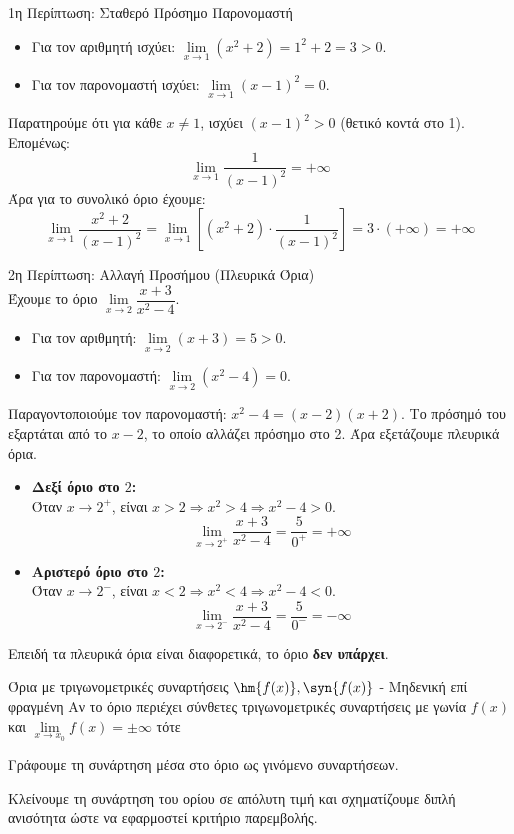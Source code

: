\begin{alist}
\item  1η Περίπτωση: Σταθερό Πρόσημο Παρονομαστή
\begin{itemize}
    \item Για τον αριθμητή ισχύει: $\lim\limits_{x\to 1} (x^2+2) = 1^2 + 2 = 3 > 0$.
    \item Για τον παρονομαστή ισχύει: $\lim\limits_{x\to 1} (x-1)^2 = 0$.
\end{itemize}
Παρατηρούμε ότι για κάθε $x \neq 1$, ισχύει $(x-1)^2 > 0$ (θετικό κοντά στο 1).
\\
Επομένως:
\[ \lim\limits_{x\to 1} \dfrac{1}{(x-1)^2} = +\infty \]
Άρα για το συνολικό όριο έχουμε:
\[ \lim\limits_{x\to 1} \dfrac{x^2+2}{(x-1)^2} = \lim\limits_{x\to 1} \left[ (x^2+2) \cdot \dfrac{1}{(x-1)^2} \right] = 3 \cdot (+\infty) = +\infty \]

\vspace{0.5cm}
\item  2η Περίπτωση: Αλλαγή Προσήμου (Πλευρικά Όρια)
\\
Έχουμε το όριο $\displaystyle \lim\limits_{x\to 2} \dfrac{x+3}{x^2-4}$.
\begin{itemize}
    \item Για τον αριθμητή: $\lim\limits_{x\to 2} (x+3) = 5 > 0$.
    \item Για τον παρονομαστή: $\lim\limits_{x\to 2} (x^2-4) = 0$.
\end{itemize}
Παραγοντοποιούμε τον παρονομαστή: $x^2-4 = (x-2)(x+2)$. Το πρόσημό του εξαρτάται από το $x-2$, το οποίο αλλάζει πρόσημο στο 2. Άρα εξετάζουμε πλευρικά όρια.
\begin{itemize}
    \item \textbf{Δεξί όριο στο $2$:}
    \\
    Όταν $x \to 2^+$, είναι $x > 2 \Rightarrow x^2 > 4 \Rightarrow x^2-4 > 0$.
    \[ \lim\limits_{x\to 2^+} \dfrac{x+3}{x^2-4} = \dfrac{5}{0^+} = +\infty \]
    
    \item \textbf{Αριστερό όριο στο $2$:}
    \\
    Όταν $x \to 2^-$, είναι $x < 2 \Rightarrow x^2 < 4 \Rightarrow x^2-4 < 0$.
    \[ \lim\limits_{x\to 2^-} \dfrac{x+3}{x^2-4} = \dfrac{5}{0^-} = -\infty \]
\end{itemize}
Επειδή τα πλευρικά όρια είναι διαφορετικά, το όριο \textbf{δεν υπάρχει}.
\end{alist}
\begin{askhsh}{Όρια με τριγωνομετρικές συναρτήσεις $ \hm{f(x)},\syn{f(x)} $ - Μηδενική επί φραγμένη}
Αν το όριο περιέχει σύνθετες τριγωνομετρικές συναρτήσεις με γωνία $ f(x) $ και $ \lim\limits_{x\to x_0}{f(x)}=\pm\infty $ τότε
\\\bhmata\begin{bhma}
\item Γράφουμε τη συνάρτηση μέσα στο όριο ως γινόμενο συναρτήσεων. 
\item Κλείνουμε τη συνάρτηση του ορίου σε απόλυτη τιμή και σχηματίζουμε διπλή ανισότητα ώστε να εφαρμοστεί κριτήριο παρεμβολής.
\end{bhma}
\end{askhsh}
